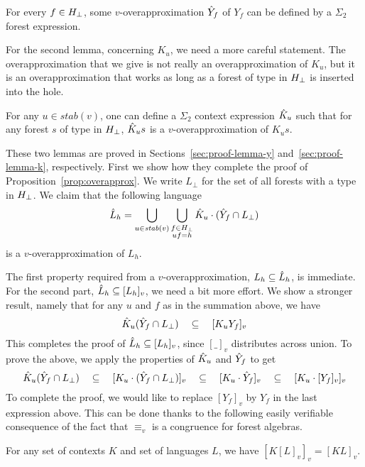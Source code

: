 \documentclass{LMCS}
\begin{document}
\begin{lem}\label{lemma:y-approx}
  For every $f \in {H_\bot}$, some $v$-overapproximation $\hat{Y}_f$ of $Y_f$ can be
  defined by a $\Sigma_2$ forest expression.
\end{lem}

For the second lemma, concerning $K_u$, we need a more careful
statement. The overapproximation that we give is not really an
overapproximation of $K_u$, but it is an overapproximation that works
as long as a forest of type in ${H_\bot}$ is inserted into the hole.
\begin{lem}\label{lemma:k-approx}
  For any $u \in stab(v)$, one can define a $\Sigma_2$ context
  expression $\hat{K}_u$ such that for any forest $s$ of type in
  ${H_\bot}$, $\hat{K}_us$ is a $v$-overapproximation of $K_us$.
\end{lem}


These two lemmas are proved in Sections~\ref{sec:proof-lemma-y}
and~\ref{sec:proof-lemma-k}, respectively. First we show how they
complete the proof of Proposition~\ref{prop:overapprox}. We write $L_\bot$ for the
set of all forests with a type in ${H_\bot}$. We claim that the  following
language
\[
 \hat{L}_h =   \bigcup_{\substack{u \in \mathit{stab}(v)} } \bigcup_{\substack{f
     \in {H_\bot}  \\ uf=h}} \hat{K}_u \cdot (\hat{Y}_f \cap L_\bot)
\]
is a $v$-overapproximation of $L_h$. 

The first property required from a $v$-overapproximation, $L_h \subseteq
\hat{L}_h$, is immediate. For the second part, $\hat{L}_h \subseteq
[L_h]_v$, we need a bit more effort. We show a stronger result, namely that for
any $u$ and $f$ as in the summation above, we have
\[
\hat{K}_u (\hat{Y}_f  \cap
 L_\bot) \quad   \subseteq \quad   [K_u Y_f]_v
\]
This completes the proof of $\hat{L}_h \subseteq [L_h]_v$, since
$[\_]_v$ distributes across union.  To prove the above, we apply the
properties of  $\hat{K}_u$ and $\hat{Y}_f$ to get
\[
 \hat{K}_u (\hat{Y}_f \cap L_\bot)
\quad  \subseteq \quad   [K_u  \cdot  (\hat{Y}_f   \cap L_\bot)]_v
\quad  \subseteq \quad   [K_u  \cdot \hat{Y}_f   ]_v
\quad  \subseteq \quad   [K_u  \cdot [Y_f]_v   ]_v
\]
To complete the proof, we would like to replace $[Y_f]_v$ by $Y_f$ in
the last expression above. This can be done thanks to the following
easily verifiable consequence of the fact that $\equiv_v$ is a congruence for
forest algebras.
\begin{fact}
 For any set of contexts $K$ and set of languages $L$, we have
 $[K[L]_v]_v=[KL]_v$.
\end{fact}
\end{document}
